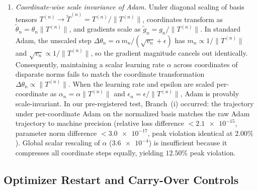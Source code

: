 \documentclass[preprint,aps,prb,longbibliography,superscriptaddress]{revtex4-2}
\begin{document}
\begin{enumerate}
  \item \textit{Coordinate-wise scale invariance of Adam.}
    Under diagonal scaling of basis tensors $T^{(n)} \to \tilde{T}^{(n)} = T^{(n)}/\|T^{(n)}\|$,
    coordinates transform as $\tilde{\theta}_n = \theta_n\|T^{(n)}\|$, and gradients
    scale as $\tilde{g}_n = g_n/\|T^{(n)}\|$. In standard Adam, the unscaled step
    $\Delta\theta_n = \alpha\, m_n / (\sqrt{v_n} + \epsilon)$ has $m_n \propto 1/\|T^{(n)}\|$
    and $\sqrt{v_n} \propto 1/\|T^{(n)}\|$, so the gradient magnitude cancels out
    identically. Consequently, maintaining a scalar learning rate $\alpha$ across
    coordinates of disparate norms fails to match the coordinate transformation
    $\Delta\theta_n \propto \|T^{(n)}\|$.
    When the learning rate and epsilon are scaled per-coordinate as
    $\alpha_n = \alpha\|T^{(n)}\|$ and $\epsilon_n = \epsilon/\|T^{(n)}\|$, Adam
    is provably scale-invariant. In our pre-registered test, Branch~(i) occurred:
    the trajectory under per-coordinate Adam on the normalized basis matches the
    raw Adam trajectory to machine precision (relative loss difference
    $< \num{2.1e-15}$, parameter norm difference $< \num{3.0e-17}$, peak violation
    identical at $2.00\%$). Global scalar rescaling of $\alpha$ ($\num{3.6e-4}$)
    is insufficient because it compresses all coordinate steps equally, yielding
    $12.50\%$ peak violation.
\end{enumerate}

\subsection{Optimizer Restart and Carry-Over Controls}
\label{sec:controls}
\end{document}
